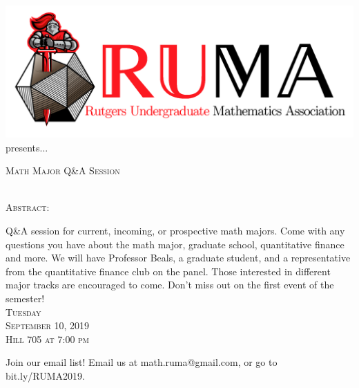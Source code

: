 \documentclass[12pt]{article}
\begin{document}

\begin{center}\includegraphics[scale=.55]{RUMAlogo.png}\\
\large  presents... \\

\vspace{2mm}
\begin{spacing}{1}
{\fontsize{40}{44}\selectfont  \textsc{
Math Major Q\&A Session}} \end{spacing}
 

 ~~\\

\normalsize
\textsc{Abstract:}

\LARGE 
Q\&A session for current, incoming, or prospective math
majors. Come with any questions you have about the math
major, graduate school, quantitative finance and more. We will
have Professor Beals, a graduate student, and a representative
from the quantitative finance club on the panel. Those interested
in different major tracks are encouraged to come. Don't miss out
on the first event of the semester!\\

\vspace{10mm} 
\Huge   \textsc{Tuesday\\September 10, 2019 \\Hill 705 at 7:00 pm}
\end{center}
\begin{center}
\Large  Join our email list! Email us at math.ruma@gmail.com, or
go to bit.ly/RUMA2019.\\
\end{center}
\end{document}
